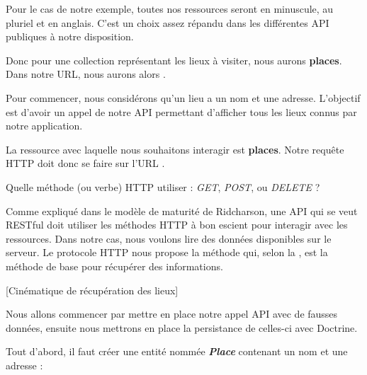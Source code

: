 \documentclass[big]{zmdocument}
\begin{document}
Pour le cas de notre exemple, toutes nos ressources seront en minuscule, au pluriel et en anglais. C'est un choix assez répandu dans les différentes API publiques à notre disposition.



Donc pour une collection représentant les lieux à visiter, nous aurons \textbf{places}. Dans notre URL, nous aurons alors .





Pour commencer, nous considérons qu'un lieu a un nom et une adresse. L'objectif est d'avoir un appel de notre API permettant d'afficher tous les lieux connus par notre application.





La ressource avec laquelle nous souhaitons interagir est \textbf{places}. Notre requête HTTP doit donc se faire sur l'URL .



\begin{Question}
Quelle méthode (ou verbe) HTTP utiliser : \textit{GET}, \textit{POST}, ou \textit{DELETE} ?
\end{Question}


Comme expliqué dans le modèle de maturité de Ridcharson, une API qui se veut RESTful doit utiliser les méthodes HTTP à bon escient pour interagir avec les ressources. 
Dans notre cas, nous voulons lire des données disponibles sur le serveur. Le protocole HTTP nous propose la méthode  qui, selon la , est la méthode de base pour récupérer des informations.



[Cinématique de récupération des lieux]




Nous allons commencer par mettre en place notre appel API avec de fausses données, ensuite nous mettrons en place la persistance de celles-ci avec Doctrine.



Tout d'abord, il faut créer une entité nommée \textbf{\textit{Place}} contenant un nom et une adresse :
\end{document}
